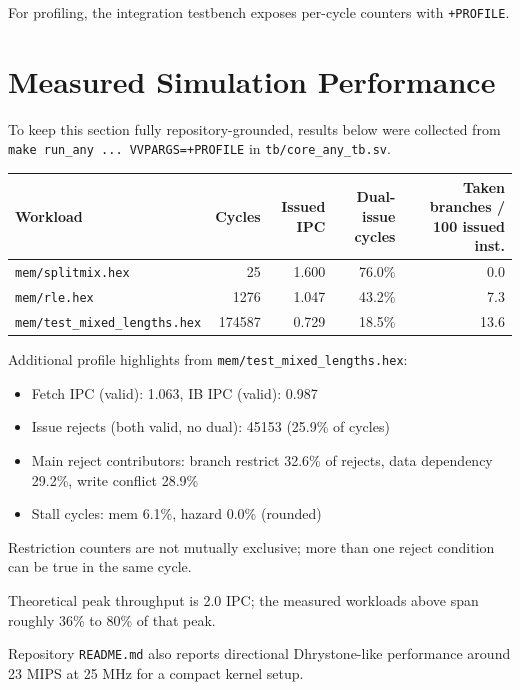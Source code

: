 \documentclass[11pt]{article}
\begin{document}
For profiling, the integration testbench exposes per-cycle counters with \texttt{+PROFILE}.

\section{Measured Simulation Performance}
To keep this section fully repository-grounded, results below were collected from \texttt{make run\_any ... VVPARGS=+PROFILE} in \texttt{tb/core\_any\_tb.sv}.

\begin{center}
\begin{tabular}{@{}lrrrr@{}}
\toprule
Workload & Cycles & Issued IPC & Dual-issue cycles & Taken branches / 100 issued inst. \\
\midrule
\texttt{mem/splitmix.hex} & 25 & 1.600 & 76.0\% & 0.0 \\
\texttt{mem/rle.hex} & 1276 & 1.047 & 43.2\% & 7.3 \\
\texttt{mem/test\_mixed\_lengths.hex} & 174587 & 0.729 & 18.5\% & 13.6 \\
\bottomrule
\end{tabular}
\end{center}

Additional profile highlights from \texttt{mem/test\_mixed\_lengths.hex}:
\begin{itemize}[leftmargin=*]
  \item Fetch IPC (valid): 1.063, IB IPC (valid): 0.987
  \item Issue rejects (both valid, no dual): 45153 (25.9\% of cycles)
  \item Main reject contributors: branch restrict 32.6\% of rejects, data dependency 29.2\%, write conflict 28.9\%
  \item Stall cycles: mem 6.1\%, hazard 0.0\% (rounded)
\end{itemize}

Restriction counters are not mutually exclusive; more than one reject condition can be true in the same cycle.

Theoretical peak throughput is 2.0 IPC; the measured workloads above span roughly 36\% to 80\% of that peak.

Repository \texttt{README.md} also reports directional Dhrystone-like performance around 23 MIPS at 25 MHz for a compact kernel setup.
\end{document}
